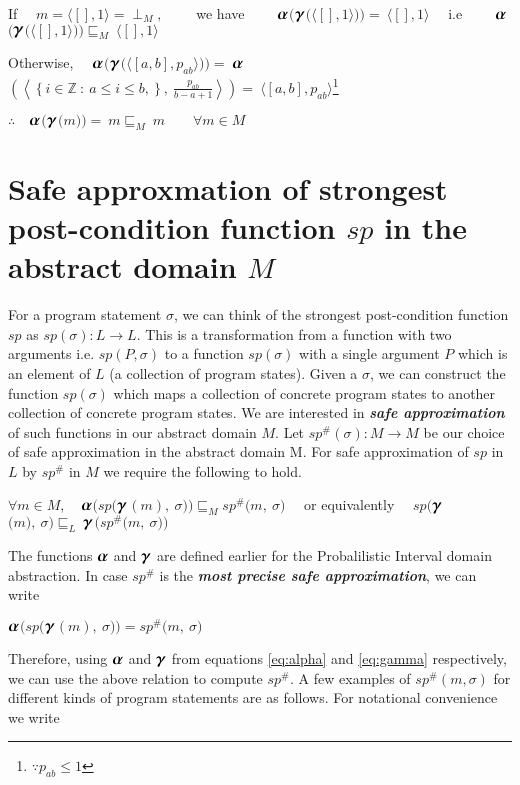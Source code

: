 \documentclass[final,3p, review, times]{util/elsarticle}
\newcommand{\ALPHA}{\large\boldsymbol{\alpha}\normalsize}
\newcommand{\GAMMA}{\large\boldsymbol{\gamma}\normalsize}
\begin{document}
If $\quad m=\langle[],1\rangle=\perp_M,\qquad$ we have $\qquad$$\ALPHA$$\Big($$\GAMMA$$\big(\langle[],1\rangle\big)\Big)=\ \langle[],1\rangle\quad$ i.e $\qquad$$\ALPHA$$\Big($$\GAMMA$$\big(\langle[],1\rangle\big)\Big)\sqsubseteq_M\ \langle[],1\rangle\quad$

Otherwise, $\quad$$\ALPHA$$\bigg($$\GAMMA$$\Big(\langle [a,b],p_{ab}\rangle\Big)\bigg) =\ $$\ALPHA$$\left(\left\langle\left\{i\in\mathbb{Z}\ :\ a\leq i\leq b,\right\},\ \displaystyle\frac{p_{ab}}{b-a+1}\right\rangle\right)=\ \langle[a,b],p_{ab}\rangle$\footnote{$\because p_{ab}\leq 1$}

$\therefore\quad$$\ALPHA$$\Big($$\GAMMA$$\big(m\big)\Big) =\ m\sqsubseteq_M\ m\qquad\forall m\in M$

\section{Safe approxmation of strongest post-condition function $sp$ in the abstract domain $M$}

For a program statement $\sigma$, we can think of the strongest post-condition function $sp$ as $sp(\sigma) : L\to L$. This is a transformation from a function with two arguments i.e. $sp(P,\sigma)$ to a function $sp(\sigma)$ with a single argument $P$ which is an element of $L$ (a collection of program states). Given a $\sigma$, we can construct the function $sp(\sigma)$ which maps a collection of concrete program states to another collection of concrete program states. We are interested in \textbf{\textit{safe approximation}} of such functions in our abstract domain $M$. Let $sp^\#(\sigma) : M\to M$ be our choice of safe approximation in the abstract domain M. For safe approximation of $sp$ in $L$ by $sp^\#$ in $M$ we require the following to hold.

\centerline{
$\forall m\in M,\quad$$\ALPHA$$\Big(sp\big($$\GAMMA$$(m),\ \sigma\big)\Big)\sqsubseteq_M sp^\#\big(m,\ \sigma\big)\quad$ or equivalently $\quad sp\Big($$\GAMMA$$\big(m\big),\ \sigma\Big)\sqsubseteq_L\ $$\GAMMA$$\Big(sp^\#\big(m,\ \sigma\big)\Big)$
}

The functions $\ALPHA$ and $\GAMMA$ are defined earlier for the Probalilistic Interval domain abstraction. In case $sp^\#$ is the \textbf{\textit{most precise safe approximation}}, we can write

\centerline{
$\ALPHA$$\Big(sp\big($$\GAMMA$$(m),\ \sigma\big)\Big)=sp^\#\big(m,\ \sigma\big)$
}
Therefore, using $\ALPHA$ and $\GAMMA$ from equations \ref{eq:alpha} and \ref{eq:gamma} respectively, we can use the above relation to compute $sp^\#$. A few examples of $sp^\#(m,\sigma)$ for different kinds of program statements are as follows. For notational convenience we write
\end{document}
